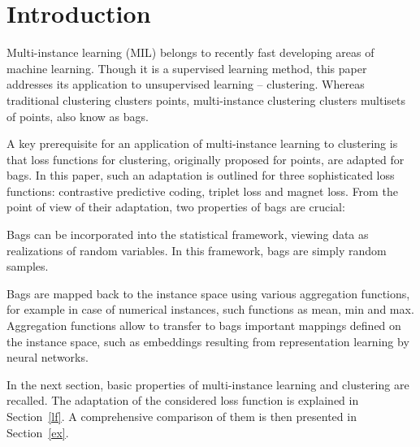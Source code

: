 \section{Introduction}

Multi-instance learning (MIL) belongs to recently fast developing areas of machine learning. Though it is a supervised learning method, this paper addresses its application to unsupervised learning -- clustering.  Whereas traditional clustering clusters points, multi-instance clustering clusters multisets of points, also know as bags.

A key prerequisite for an application of multi-instance learning to clustering is that loss functions for clustering, originally proposed for points, are adapted for bags. In this paper, such an adaptation is outlined for three sophisticated loss functions:  contrastive predictive coding, triplet loss and magnet loss. From the point of view of their adaptation, two properties of bags are crucial:
\begin{romanitems}
	\item Bags can be incorporated into the statistical framework, viewing data as realizations of random variables. In this framework, bags are simply random samples.
	\item Bags are mapped back to the instance space using various aggregation functions, for example in case of numerical instances, such functions as mean, min and max. Aggregation functions allow to transfer to bags important mappings defined on the instance space, such as embeddings resulting from representation learning by neural networks.
\end{romanitems}

In the next section, basic properties of multi-instance learning and clustering are recalled. The adaptation of the considered loss function is explained in Section~\ref{lf}. A comprehensive comparison of them is then presented in Section~\ref{ex}.
